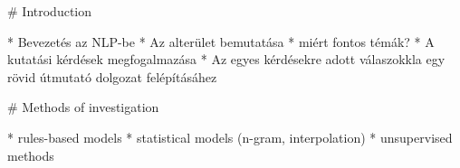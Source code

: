 
# Introduction

* Bevezetés az NLP-be
* Az alterület bemutatása
  * miért fontos témák?
* A kutatási kérdések megfogalmazása
* Az egyes kérdésekre adott válaszokkla egy rövid útmutató  dolgozat felépításáhez

# Methods of investigation

* rules-based models
* statistical models (n-gram, interpolation)
* unsupervised methods
